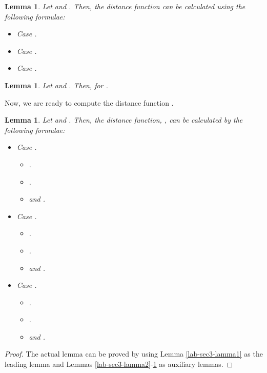 \documentclass[letter]{ieice}
\newtheorem{sec3_lemma5}[sec3_lemma1]{Lemma}
\newtheorem{sec3_lemma6}[sec3_lemma1]{Lemma}
\newtheorem{sec3_lemma7}[sec3_lemma1]{Lemma}
\begin{document}
\begin{sec3_lemma5}\label{sec3-lamma5-label}
Let  and . Then, the distance function  can be calculated using the following formulae:
\begin{itemize}
\item Case .

\item Case .

\item Case .

\end{itemize}
\end{sec3_lemma5}
\begin{sec3_lemma6}\label{sec3-lemma6}
Let  and . Then,  for .
\end{sec3_lemma6}   

Now, we are ready to compute the distance function .

\begin{sec3_lemma7}\label{sec3-lemma7}
Let  and . Then, the distance function, , can be calculated by the following formulae:
\begin{itemize}
\item Case .
\begin{itemize}
\item .

\item .

\item  and .

\end{itemize}                           
\item Case .
\begin{itemize}
\item .

\item .

\item  and .

\end{itemize}                    
\item Case .
\begin{itemize}
\item .

\item .

\item  and .

\end{itemize}           
\end{itemize}
\end{sec3_lemma7}
\begin{proof}
The actual lemma can be proved by using Lemma \ref{lab-sec3-lamma1} as the leading lemma and Lemmas \ref{lab-sec3-lamma2}-\ref{sec3-lemma6} as auxiliary lemmas.
\end{proof}
\end{document}
